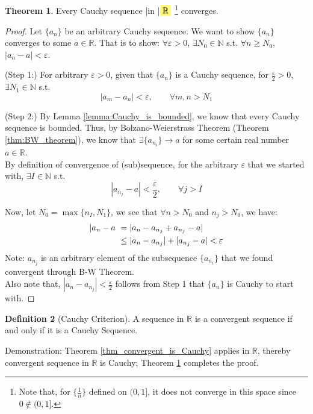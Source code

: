 \documentclass[12pt]{article}
\newcommand{\N}{{\mathbb N}}
\newcommand{\R}{{\mathbb R}}
\theoremstyle{definition}
\newtheorem{theorem}{Theorem}[section]
\newtheorem{definition}[theorem]{Definition}
\theoremstyle{plain}
\newcommand{\highlight}[1]{%
 \colorbox{yellow!50}{$\displaystyle#1$}}
\begin{document}
\begin{theorem}
    \label{thm:Cauchy_convergent_in_R}
    Every Cauchy sequence \yverb|in |$\highlight{\R}$ 
    \footnote{Note that, for $\{\frac{1}{n}\}$ defined on $(0,1]$, it does not 
    converge in this space since $0\not\in (0,1]$.}
    converges.
    \begin{proof} Let $\{a_n\}$ be an arbitrary Cauchy sequence. 
        We want to show $\{a_n \}$ converges to some $a \in \R$. That is to 
        show: $\forall \varepsilon > 0$, $\exists N_0 \in \N$ s.t. $\forall n 
        \ge N_0$, $|a_n - a| < \varepsilon$.

        (Step 1:) For arbitrary $\varepsilon > 0$, given that $\{a_n \}$ is a Cauchy 
        sequence, for $\frac{\varepsilon}{2} > 0$, $\exists N_1 \in \N$ s.t. 
        \[
            |a_m - a_n| < \varepsilon, \qquad \forall m, n > N_1
        \]

        (Step 2:) By Lemma \ref{lemma:Cauchy_is_bounded}, we know that every Cauchy 
        sequence is bounded.
        Thus, by Bolzano-Weierstrass Theorem (Theorem \ref{thm:BW_theorem}), we 
        know that $\exists \{a_{n_i}\} \to a$ for some certain real number $a  
        \in \R$.  \\ By definition of 
        convergence of (sub)sequence, for the arbitrary $\varepsilon$ that we 
        started with, $\exists I \in \N$ s.t.
        \[
            |a_{n_j} - a | < \frac{\varepsilon}{2}, \qquad \forall j > I
        \]

        Now, let $N_0 = \max \{ n_I, N_1\}$, we see that $\forall n > N_0$ and 
        $n_j > N_0$, we have: 
        \[
            \aligned 
            |a_n - a \ & = | a_n - a_{n_j} + a_{n_j} - a | \\
                       & \le |a_n - a_{n_j}| + |a_{n_j} - a| < \varepsilon
           \endaligned
        \]
        Note: $a_{n_j}$ is an arbitrary element of the subsequence $\{a_{n_i}\}$ 
        that we found convergent through B-W Theorem.\\
        Also note that, $|a_n - a_{n_j}| < \frac{\varepsilon}{2}$ follows from 
        Step 1 that $\{a_n\}$ is Cauchy to start with.
    \end{proof}
\end{theorem}

\begin{definition}
    [Cauchy Criterion]
    A sequence in $\R$ is a convergent sequence if and only if it is a Cauchy 
    Sequence. 

    Demonstration: 
    Theorem \ref{thm_convergent_is_Cauchy} applies in $\R$, thereby convergent 
    sequence in $\R$ is Cauchy; Theorem \ref{thm:Cauchy_convergent_in_R} 
    completes the proof.
\end{definition}
\end{document}
